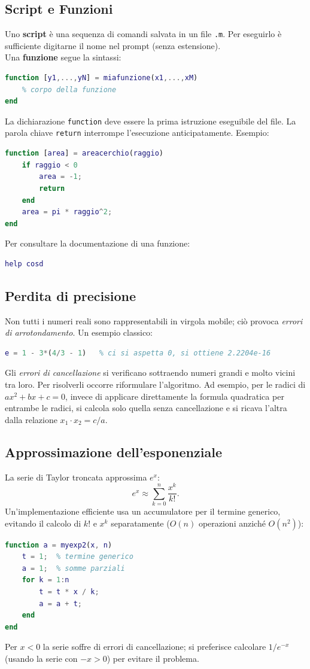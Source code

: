 \documentclass[12pt,a4paper,]{report}
\begin{document}
\subsection{Script e Funzioni}

Uno \textbf{script} è una sequenza di comandi salvata in un file \texttt{.m}.
Per eseguirlo è sufficiente digitarne il nome nel prompt (senza estensione).\\
Una \textbf{funzione} segue la sintassi:
\begin{lstlisting}[language=Matlab]
function [y1,...,yN] = miafunzione(x1,...,xM)
    % corpo della funzione
end
\end{lstlisting}
La dichiarazione \texttt{function} deve essere la prima istruzione eseguibile
del file. La parola chiave \texttt{return} interrompe l'esecuzione anticipatamente.
Esempio:
\begin{lstlisting}[language=Matlab]
function [area] = areacerchio(raggio)
    if raggio < 0
        area = -1;
        return
    end
    area = pi * raggio^2;
end
\end{lstlisting}
Per consultare la documentazione di una funzione:
\begin{lstlisting}[language=Matlab]
help cosd
\end{lstlisting}

\subsection{Perdita di precisione}

Non tutti i numeri reali sono rappresentabili in virgola mobile; ciò provoca
\textit{errori di arrotondamento}. Un esempio classico:
\begin{lstlisting}[language=Matlab]
e = 1 - 3*(4/3 - 1)   % ci si aspetta 0, si ottiene 2.2204e-16
\end{lstlisting}
Gli \textit{errori di cancellazione} si verificano sottraendo numeri grandi
e molto vicini tra loro. Per risolverli occorre riformulare l'algoritmo.
Ad esempio, per le radici di $ax^2 + bx + c = 0$, invece di applicare
direttamente la formula quadratica per entrambe le radici, si calcola solo
quella senza cancellazione e si ricava l'altra dalla relazione $x_1 \cdot x_2 = c/a$.

\subsection{Approssimazione dell'esponenziale}

La serie di Taylor troncata approssima $e^x$:
\[
  e^x \approx \sum_{k=0}^{n} \frac{x^k}{k!}.
\]
Un'implementazione efficiente usa un accumulatore per il termine generico,
evitando il calcolo di $k!$ e $x^k$ separatamente ($O(n)$ operazioni anziché $O(n^2)$):
\begin{lstlisting}[language=Matlab]
function a = myexp2(x, n)
    t = 1;  % termine generico
    a = 1;  % somme parziali
    for k = 1:n
        t = t * x / k;
        a = a + t;
    end
end
\end{lstlisting}
Per $x < 0$ la serie soffre di errori di cancellazione; si preferisce calcolare
$1/e^{-x}$ (usando la serie con $-x > 0$) per evitare il problema.
\end{document}
